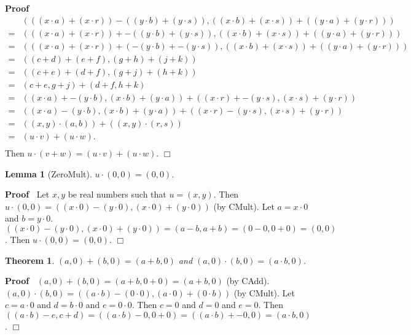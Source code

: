 \documentclass{article}
\newenvironment{forthel}{\begin{leftbar}}{\end{leftbar}}
\newenvironment{proof}{\noindent\textbf{Proof\ }}{\hspace*{\fill}$\Box$\medskip}
\newtheorem{lemma}{Lemma}
\newtheorem{theorem}{Theorem}
\newcommand{\cmul}{\cdot}
\newcommand{\cadd}{+}
\begin{document}
\begin{forthel}
\begin{proof}
\begin{align*}
&( ((x \cdot a) + (x \cdot r)) - ((y \cdot b) + (y \cdot s)) , ((x \cdot b) + (x \cdot s)) + ((y \cdot a) + (y \cdot r)) )\\
= &(((x \cdot a) + (x \cdot r)) + -((y \cdot b) + (y \cdot s)) , ((x \cdot b) + (x \cdot s)) + ((y \cdot a) + (y \cdot r)) )\\
= &(((x \cdot a) + (x \cdot r)) + (-(y \cdot b) + -(y \cdot s)) , ((x \cdot b) + (x \cdot s)) + ((y \cdot a) + (y \cdot r)) )\\
= &((c + d) + (e + f) , (g + h) + (j + k))\\
= &((c + e) + (d + f) , (g + j) + (h + k))\\
= &(c+e,g+j)  \cadd  (d+f,h+k)\\
= &((x \cdot a) + -(y \cdot b), (x \cdot b) + (y \cdot a))  \cadd  ((x \cdot r) + -(y \cdot s) , (x \cdot s) + (y \cdot r))\\
= &((x \cdot a) - (y \cdot b), (x \cdot b) + (y \cdot a))  \cadd  ((x \cdot r) - (y \cdot s) , (x \cdot s) + (y \cdot r))\\
= &((x,y)  \cmul  (a,b))  \cadd  ((x,y)  \cmul  (r,s)) \\
= &(u \cmul v)  \cadd  (u \cmul w).\\
\end{align*}
Then $u \cmul (v \cadd w) = (u \cmul v)  \cadd  (u \cmul w)$.
\end{proof}


\begin{lemma}[ZeroMult] $u \cmul (0,0) = (0,0)$.
\end{lemma}\begin{proof}
 Let $x,y$ be real numbers such that $u = (x,y)$. \newline
  Then $u \cmul (0,0) = ((x \cdot 0) - (y \cdot 0), (x \cdot 0) + (y \cdot 0))$ (by CMult). \newline
Let $a=x \cdot 0$ and $b=y \cdot 0$.\newline
$((x \cdot 0) - (y \cdot 0), (x \cdot 0) + (y \cdot 0)) = (a-b,a+b) = (0 - 0, 0 + 0) = (0,0)$. \newline
Then $u \cmul (0,0) = (0,0)$. 
\end{proof}


\begin{theorem}
 $(a,0)  \cadd  (b,0) = (a+b,0)$ and $(a,0) \cmul (b,0) = (a \cdot b,0)$.
\end{theorem}\begin{proof}
  $(a,0)  \cadd  (b,0) = (a+b,0+0) = (a+b,0)$ (by CAdd).\newline
$(a,0)  \cmul  (b,0) = ((a \cdot b) - (0 \cdot 0), (a \cdot 0) + (0 \cdot b))$ (by CMult).\newline
Let $c = a \cdot 0$ and $d = b \cdot 0$ and $e = 0 \cdot 0$.\newline
Then $c = 0$ and $d = 0$ and $e = 0$.\newline
Then $((a \cdot b) - e, c + d) = ((a \cdot b) -0, 0 + 0) = ((a \cdot b )+ -0,0) = (a \cdot b,0)$ . \end{proof}



\end{forthel}
\end{document}
